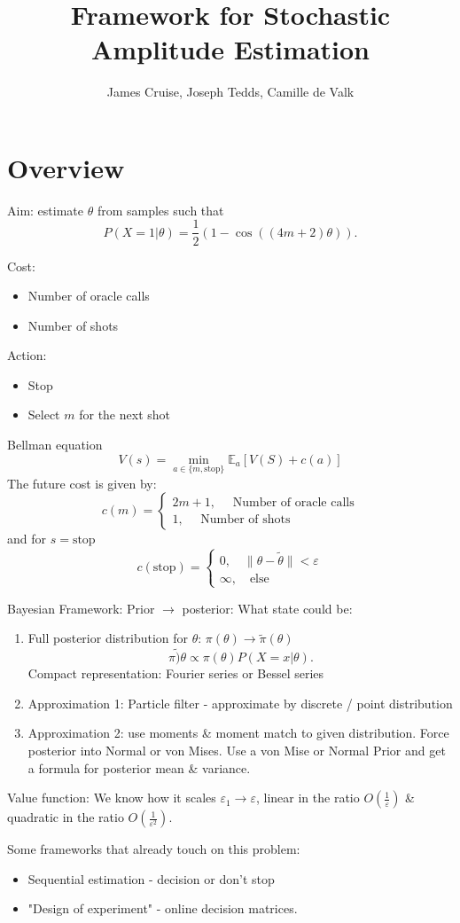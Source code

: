 \documentclass[]{article}
\title{Framework for Stochastic Amplitude Estimation}
\author{James Cruise, Joseph Tedds, Camille de Valk}
\begin{document}
\maketitle



\section{Overview}
Aim: estimate $\theta$ from samples such that
\[
P(X = 1 | \theta) = \frac{1}{2} ( 1- \cos((4m + 2) \theta)).
\]

Cost:
\begin{itemize}
	\item Number of oracle calls
	\item Number of shots
\end{itemize}

Action:
\begin{itemize}
	\item Stop
	\item Select $m$ for the next shot
\end{itemize}
Bellman equation
\[
V(s) = \underset{a \in \{m,\text{stop}\}}{ \min } \mathbb{E}_a \left[ V(S) + c(a)\right]
\]
The future cost is given by:
\[
c(m) = \begin{cases}
	2m + 1, \quad \text{ Number of oracle calls} \\
	1, \quad \text{ Number of shots}
\end{cases}
\]
and for $s = \text{stop}$
\[
c(\text{stop}) = \begin{cases}
	0, \quad \| \theta - \tilde{\theta}\| < \varepsilon \\
	\infty , \quad \text{else}
\end{cases}
\]

Bayesian Framework:
Prior $\to$ posterior:
What state could be:
\begin{enumerate}
	\item Full posterior distribution for $\theta$: $\pi(\theta) \to \tilde{\pi}(\theta)$
	\[
	\tilde{\pi)\theta} \propto \pi(\theta) P(X = x | \theta).
	\]
	Compact representation: Fourier series or Bessel series
	\item Approximation 1: Particle filter - approximate by discrete / point distribution
	\item Approximation 2: use moments \& moment match to given distribution. Force posterior into Normal or von Mises. Use a von Mise or Normal Prior and get a formula for posterior mean \& variance.
\end{enumerate}

Value function:
We know how it scales $\varepsilon_1 \to \varepsilon$, linear in the ratio $O(\frac{1}{\varepsilon})$ \& quadratic in the ratio $O(\frac{1}{\varepsilon^2})$.


Some frameworks that already touch on this problem:
\begin{itemize}
	\item Sequential estimation - decision or don't stop
	\item "Design of experiment" - online decision matrices.
\end{itemize}
\end{document}
